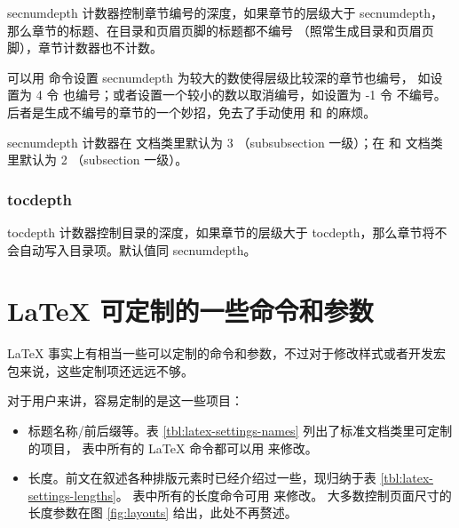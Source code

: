 secnumdepth 计数器控制章节编号的深度，如果章节的层级大于 secnumdepth，那么章节的标题、在目录和页眉页脚的标题都不编号
（照常生成目录和页眉页脚），章节计数器也不计数。

可以用  命令设置 secnumdepth 为较大的数使得层级比较深的章节也编号，
如设置为 4 令  也编号；或者设置一个较小的数以取消编号，如设置为 -1 令  不编号。
后者是生成不编号的章节的一个妙招，免去了手动使用  和  的麻烦。

secnumdepth 计数器在  文档类里默认为 3 （subsubsection 一级）；在  和  文档类里默认为 2 （subsection 一级）。

\subsubsection{tocdepth}

tocdepth 计数器控制目录的深度，如果章节的层级大于 tocdepth，那么章节将不会自动写入目录项。默认值同 secnumdepth。

\section{\LaTeX{} 可定制的一些命令和参数}\label{sec:latex-settings}

\LaTeX{} 事实上有相当一些可以定制的命令和参数，不过对于修改样式或者开发宏包来说，这些定制项还远远不够。

对于用户来讲，容易定制的是这一些项目：

\begin{itemize}
  \item 标题名称/前后缀等。表 \ref{tbl:latex-settings-names} 列出了标准文档类里可定制的项目，
  表中所有的 \LaTeX{} 命令都可以用  来修改。
  \item 长度。前文在叙述各种排版元素时已经介绍过一些，现归纳于表 \ref{tbl:latex-settings-lengths}。
  表中所有的长度命令可用  来修改。
  大多数控制页面尺寸的长度参数在图 \ref{fig:layouts} 给出，此处不再赘述。
\end{itemize}

